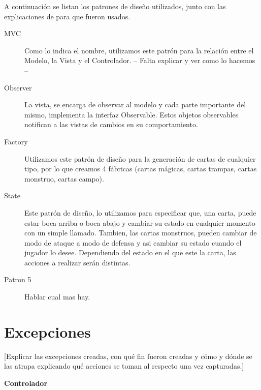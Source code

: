  \bigskip

A continuación se listan los patrones de diseño utilizados, junto con las explicaciones de para que fueron usados.

 \bigskip

\begin{description}

\item[MVC] Como lo indica el nombre, utilizamos este patrón para la relación entre el Modelo, la Vista y el Controlador. -- Falta explicar y ver como lo hacemos --

\item[Observer] La vista, se encarga de observar al modelo y cada parte importante del mismo, implementa la interfaz Observable. Estos objetos observables notifican a las vistas de cambios en su comportamiento. 

\item[Factory] Utilizamos este patrón de diseño para la generación de cartas de cualquier tipo, por lo que creamos 4 fábricas (cartas mágicas, cartas trampas, cartas monstruo, cartas campo).

\item[State] Este patrón de diseño, lo utilizamos para especificar que, una carta, puede estar boca arriba o boca abajo y cambiar su estado en cualquier momento con un simple llamado. Tambien, las cartas monstruos, pueden cambiar de modo de ataque a modo de defensa y asi cambiar su estado cuando el jugador lo desee. Dependiendo del estado en el que este la carta, las acciones a realizar serán distintas.  

\item[Patron 5] Hablar cual mas hay.

\end{description}





\section{Excepciones}

[Explicar las excepciones creadas, con qué fin fueron creadas y cómo y
dónde se las atrapa explicando qué acciones se toman al respecto una vez
capturadas.]

\bigskip

{\large \raggedright \textbf{Controlador}}

